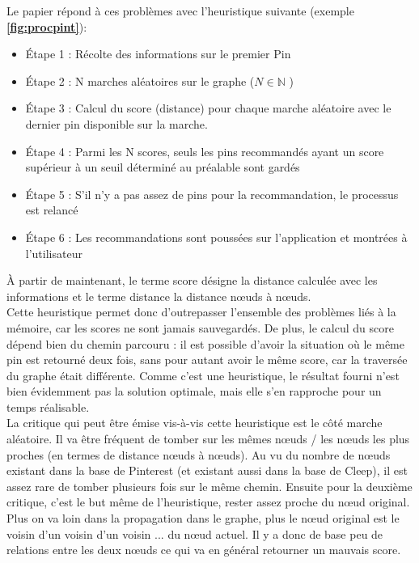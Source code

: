 \documentclass{article} %
\begin{document}
Le papier répond à ces problèmes avec l'heuristique suivante (exemple \textbf{\ref{fig:procpint}}):
\begin{itemize}
 \itemsep 0em
 \item Étape 1 : Récolte des informations sur le premier Pin
 \item Étape 2 : N marches aléatoires sur le graphe ($N \in \mathbb{N}$ )
 \item Étape 3 : Calcul du score (distance) pour chaque marche aléatoire avec le dernier pin disponible sur la marche.
 \item Étape 4 : Parmi les N scores, seuls les pins recommandés ayant un score supérieur à un seuil déterminé au préalable sont gardés
 \item Étape 5 : S'il n'y a pas assez de pins pour la recommandation, le processus est relancé 
 \item Étape 6 : Les recommandations sont poussées sur l'application et montrées à l'utilisateur
\end{itemize}
À partir de maintenant, le terme score désigne la distance calculée avec les informations et le terme distance la distance nœuds à nœuds.\\
Cette heuristique permet donc d'outrepasser l'ensemble des problèmes liés à la mémoire, car les scores ne sont jamais sauvegardés. De plus, le calcul du score dépend bien du chemin parcouru : il est possible d'avoir la situation où le même pin est retourné deux fois, sans pour autant avoir le même score, car la traversée du graphe était différente. Comme c'est une heuristique, le résultat fourni n'est bien évidemment pas la solution optimale, mais elle s'en rapproche pour un temps réalisable.\\
La critique qui peut être émise vis-à-vis cette heuristique est le côté marche aléatoire. Il va être fréquent de tomber sur les mêmes nœuds / les nœuds les plus proches (en termes de distance nœuds à nœuds). Au vu du nombre de nœuds existant dans la base de Pinterest (et existant aussi dans la base de Cleep), il est assez rare de tomber plusieurs fois sur le même chemin. Ensuite pour la deuxième critique, c'est le but même de l'heuristique, rester assez proche du nœud original. Plus on va loin dans la propagation dans le graphe, plus le nœud original est le voisin d'un voisin d'un voisin ... du nœud actuel. Il y a donc de base peu de relations entre les deux nœuds ce qui va en général retourner un mauvais score.\\
\end{document}

